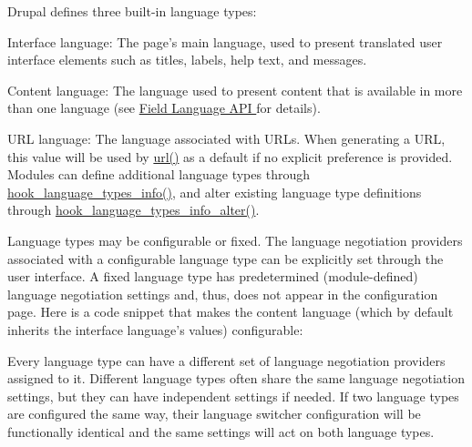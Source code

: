 Drupal defines three built-\/in language types:
\begin{DoxyItemize}
\item Interface language: The page's main language, used to present translated user interface elements such as titles, labels, help text, and messages.
\item Content language: The language used to present content that is available in more than one language (see \hyperlink{group__field__language}{Field Language API } for details).
\item URL language: The language associated with URLs. When generating a URL, this value will be used by \hyperlink{common_8inc_a43b2a0594431556db49df980801d8807}{url()} as a default if no explicit preference is provided. Modules can define additional language types through \hyperlink{group__language__negotiation_ga8932d2167557c18966cd033cfbe0f37e}{hook\_\-language\_\-types\_\-info()}, and alter existing language type definitions through \hyperlink{group__language__negotiation_ga9752378ca7c389892fea3fb2960263dd}{hook\_\-language\_\-types\_\-info\_\-alter()}.
\end{DoxyItemize}

Language types may be configurable or fixed. The language negotiation providers associated with a configurable language type can be explicitly set through the user interface. A fixed language type has predetermined (module-\/defined) language negotiation settings and, thus, does not appear in the configuration page. Here is a code snippet that makes the content language (which by default inherits the interface language's values) configurable: 


Every language type can have a different set of language negotiation providers assigned to it. Different language types often share the same language negotiation settings, but they can have independent settings if needed. If two language types are configured the same way, their language switcher configuration will be functionally identical and the same settings will act on both language types.

